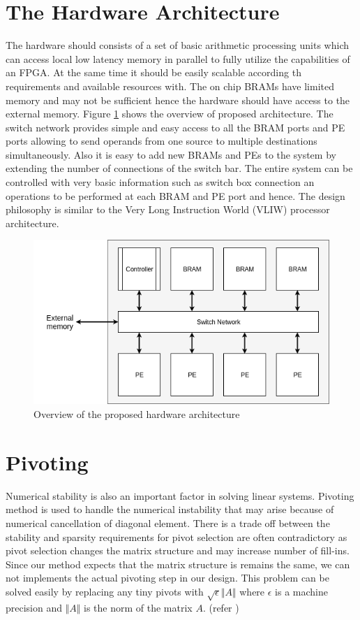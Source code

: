 \section{The Hardware Architecture}
The hardware should consists of a set of basic arithmetic processing units which can 
access local low latency memory in parallel to fully utilize the capabilities of 
an FPGA. At the same time it should be easily scalable according th requirements
and available resources with. The on chip BRAMs have limited memory and may not
be sufficient hence the hardware should have access to the external memory.
Figure \ref{fig:ParLU:hwArch} shows the overview of proposed architecture. The 
switch network provides simple and easy access to all the BRAM ports and PE ports
allowing to send operands from one source to multiple destinations simultaneously.
Also it is easy to add new BRAMs and PEs to the system by extending the number of connections
of the switch bar. The entire system can be controlled with very basic information such as 
switch box connection an operations to be performed at each BRAM and PE port and hence.
The design philosophy is similar to the  Very Long Instruction World (VLIW) processor
architecture.
\begin{figure}
    \centering
    \includegraphics[width = 0.75\linewidth]{./ParallelLU/hardwareOverView.png}
    \caption{Overview of the proposed hardware architecture}
    \label{fig:ParLU:hwArch}
\end{figure}


\section{Pivoting}
Numerical stability is also an important factor in solving linear systems. 
Pivoting method is used to handle the numerical instability that may arise because
of numerical cancellation of diagonal element. There is a trade off between the stability
and sparsity requirements for pivot selection are often contradictory as pivot 
selection changes the matrix structure and may increase number of fill-ins. Since our
method expects that the matrix structure is remains the same, we can not implements the 
actual pivoting step in our design. This problem can be solved easily by 
replacing any tiny pivots with $\sqrt{\epsilon}\Vert A \Vert$ where $\epsilon$ is a machine precision 
and $\Vert A \Vert$ is the norm of the matrix $A$. (refer \cite{Nechma})